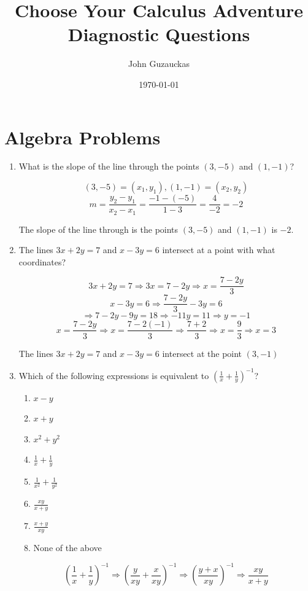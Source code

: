 \documentclass{article}
\title{Choose Your Calculus Adventure \\
        Diagnostic Questions}
\author{John Guzauckas}
\date{\today}
\begin{document}
\maketitle

\section{Algebra Problems}
\begin{enumerate}
\item What is the slope of the line through the points $(3, -5)$ and $(1, -1)$?

\[(3, -5) = (x_{1},y_{1}), (1, -1) = (x_{2}, y_{2})\]
\[m = \frac{y_{2}-y_{1}}{x_{2}-x_{1}} = \frac{-1 - (-5)}{1 - 3} = \frac{4}{-2} = -2\]

The slope of the line through is the points $(3, -5)$ and $(1, -1)$ is $-2$.

\item The lines $3x + 2y = 7$ and $x - 3y = 6$ intersect at a point with what coordinates?

\[3x + 2y = 7 \Longrightarrow 3x = 7 - 2y \Longrightarrow x = \frac{7 - 2y}{3}\]
\[x - 3y = 6 \Longrightarrow \frac{7 - 2y}{3} - 3y = 6 \]
\[\Longrightarrow 7 - 2y - 9y = 18 \Longrightarrow -11y = 11 \Longrightarrow y = -1\]
\[x = \frac{7 - 2y}{3} \Longrightarrow x = \frac{7 - 2(-1)}{3} \Longrightarrow \frac{7 + 2}{3}
\Longrightarrow x = \frac{9}{3} \Longrightarrow x = 3\]

The lines $3x + 2y = 7$ and $x - 3y = 6$ intersect at the point $(3, -1)$

\item Which of the following expressions is equivalent to ${\left(\frac{1}{x} + \frac{1}{y}\right)}^{-1}$?
    \begin{enumerate}
    \item $x - y$
    \item $x + y$
    \item $x^{2} + y^{2}$
    \item $\frac{1}{x} + \frac{1}{y}$
    \item $\frac{1}{x^{2}} + \frac{1}{y^{2}}$
    \item $\frac{xy}{x + y}$
    \item $\frac{x + y}{xy}$
    \item None of the above
    \end{enumerate}
\[{\left(\frac{1}{x} + \frac{1}{y}\right)}^{-1} \Longrightarrow 
    {\left(\frac{y}{xy} + \frac{x}{xy}\right)}^{-1} \Longrightarrow
    {\left(\frac{y + x}{xy}\right)}^{-1} \Longrightarrow
    \frac{xy}{x + y}\] 


\end{enumerate}
\end{document}
